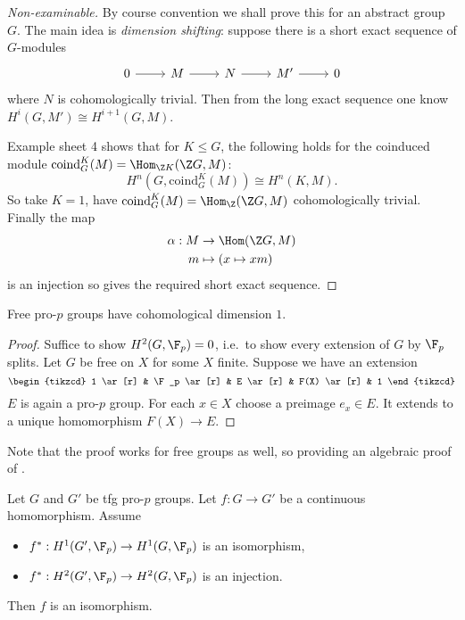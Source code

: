 \documentclass[a4paper]{article}
\begin{document}
\begin{proof}[Non-examinable]
  By course convention we shall prove this for an abstract group \(G\). The main idea is \emph{dimension shifting}: suppose there is a short exact sequence of \(G\)-modules
  \[
    \begin{tikzcd}
      0 \ar[r] & M \ar[r] & N \ar[r] & M' \ar[r] & 0
    \end{tikzcd}
  \]
  where \(N\) is cohomologically trivial. Then from the long exact sequence one know \(H^i(G, M') \cong H^{i + 1}(G, M)\).
  
  Example sheet 4 shows that for \(K \leq G\), the following holds for the coinduced module \(\mathrm{coind}^K_G(M) = \Hom_{\Z K}(\Z G, M)\):
  \[
    H^n(G, \mathrm{coind}^K_G(M)) \cong H^n(K, M).
  \]
  So take \(K = 1\), have \(\mathrm{coind}^K_G(M) = \Hom_\Z(\Z G, M)\) cohomologically trivial. Finally the map
  \begin{align*}
    \alpha: M &\to \Hom(\Z G, M) \\
    m &\mapsto (x \mapsto xm)
  \end{align*}
  is an injection so gives the required short exact sequence.
\end{proof}

\begin{corollary}
  Free pro-\(p\) groups have cohomological dimension \(1\).
\end{corollary}

\begin{proof}
  Suffice to show \(H^2(G, \F_p) = 0\), i.e.\ to show every extension of \(G\) by \(\F_p\) splits. Let \(G\) be free on \(X\) for some \(X\) finite. Suppose we have an extension
  \[
    \begin{tikzcd}
      1 \ar[r] & \F_p \ar[r] & E \ar[r] & F(X) \ar[r] & 1
    \end{tikzcd}
  \]
  \(E\) is again a pro-\(p\) group. For each \(x \in X\) choose a preimage \(e_x \in E\). It extends to a unique homomorphism \(F(X) \to E\).
\end{proof}

Note that the proof works for free groups as well, so providing an algebraic proof of .

\begin{theorem}
  Let \(G\) and \(G'\) be tfg pro-\(p\) groups. Let \(f: G \to G'\) be a continuous homomorphism. Assume
  \begin{itemize}
  \item \(f^*: H^1(G', \F_p) \to H^1(G, \F_p)\) is an isomorphism,
  \item \(f^*: H^2(G', \F_p) \to H^2(G, \F_p)\) is an injection.
  \end{itemize}
  Then \(f\) is an isomorphism.
\end{theorem}
\end{document}
